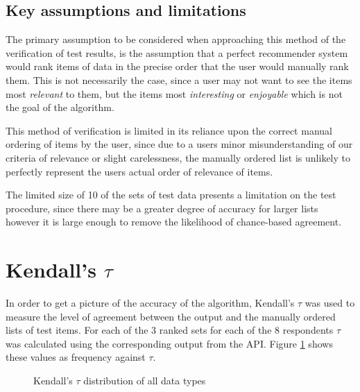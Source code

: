 \subsection{Key assumptions and limitations}

The primary assumption to be considered when approaching this method of the verification of test results, is the assumption that a perfect recommender system would rank items of data in the precise order that the user would manually rank them. This is not necessarily the case, since a user may not want to see the items most \textit{relevant} to them, but the items most \textit{interesting} or \textit{enjoyable} which is not the goal of the algorithm. 

This method of verification is limited in its reliance upon the correct manual ordering of items by the user, since due to a users minor misunderstanding of our criteria of relevance or slight carelessness, the manually ordered list is unlikely to perfectly represent the users actual order of relevance of items. 

The limited size of 10 of the sets of test data presents a limitation on the test procedure, since there may be a greater degree of accuracy for larger lists however it is large enough to remove the likelihood of chance-based agreement. 

\section{Kendall's $\tau$}

In order to get a picture of the accuracy of the algorithm, Kendall's $\tau$ was used to measure the level of agreement between the output and the manually ordered lists of test items. For each of the 3 ranked sets for each of the 8 respondents $\tau$ was calculated using the corresponding output from the API. Figure \ref{kendallsTauGraph} shows these values as frequency against $\tau$. 

\begin{figure}[ht!]
    \caption{Kendall's $\tau$ distribution of all data types}
    \label{kendallsTauGraph}
\end{figure}


